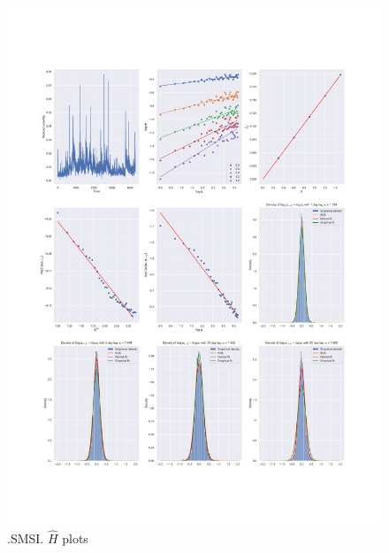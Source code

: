 	\begin{figure}[h]
		\centering
		\includegraphics[width=\linewidth]{fig/.SMSI.pdf}
		\caption{.SMSI. $\hat{H}$ plots}
	\end{figure}

